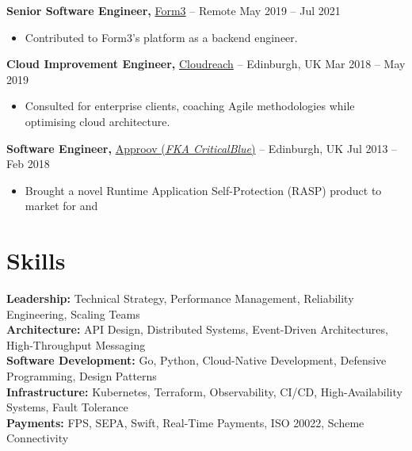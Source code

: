 \documentclass[11pt]{article}       %
\begin{document}
\textbf{Senior Software Engineer,} \href{https://form3.tech/}{Form3} -- Remote \hfill May 2019 -- Jul 2021 \\
\vspace{-9pt}
\begin{itemize}
  \item Contributed to Form3's platform as a backend engineer. \\
\end{itemize}

\textbf{Cloud Improvement Engineer,} \href{https://eviden.com/about-us/legacy-brands/cloudreach/}{Cloudreach} -- Edinburgh, UK \hfill Mar 2018 -- May 2019 \\
\vspace{-9pt}
\begin{itemize}
  \item Consulted for enterprise clients, coaching Agile methodologies while optimising cloud architecture. \\
\end{itemize}

\textbf{Software Engineer,} \href{https://approov.io/}{Approov (\textit{FKA CriticalBlue})} -- Edinburgh, UK \hfill Jul 2013 -- Feb 2018 \\ 
\vspace{-9pt}
\begin{itemize}
  \item Brought a novel Runtime Application Self-Protection (RASP) product to market for  and  \\
\end{itemize}

\section*{Skills}
\textbf{Leadership:} Technical Strategy, Performance Management, Reliability Engineering, Scaling Teams \\
\textbf{Architecture:} API Design, Distributed Systems, Event-Driven Architectures, High-Throughput Messaging \\  
\textbf{Software Development:} Go, Python, Cloud-Native Development, Defensive Programming, Design Patterns \\
\textbf{Infrastructure:} Kubernetes, Terraform, Observability, CI/CD, High-Availability Systems, Fault Tolerance \\
\textbf{Payments:} FPS, SEPA, Swift, Real-Time Payments, ISO 20022, Scheme Connectivity \\
\end{document}
